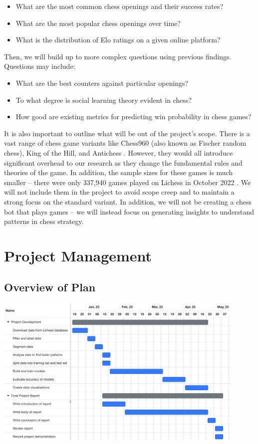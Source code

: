 \documentclass[%
 superscriptaddress,
showpacs,preprintnumbers,
 amsmath,
 amssymb,
 aps,
 pra,
showkeys,
onecolumn,
notitlepage,
11pt,
tightenlines      %
]{revtex4-1}
\begin{document}
\begin{itemize}
    \setlength\itemsep{0em}
    \item What are the most common chess openings and their success rates?
    \item What are the most popular chess openings over time?
    \item What is the distribution of Elo ratings on a given online platform?
\end{itemize}

Then, we will build up to more complex questions using previous findings. Questions may include:
\begin{itemize}
    \setlength\itemsep{0em}
    \item What are the best counters against particular openings?
    \item To what degree is social learning theory evident in chess?
    \item How good are existing metrics for predicting win probability in chess games?
\end{itemize}

It is also important to outline what will be out of the project's scope. There is a vast range of chess game variants like Chess960 (also known as Fischer random chess), King of the Hill, and Antichess \cite{lichessBlitzRatingDistribution}. However, they would all introduce significant overhead to our research as they change the fundamental rules and theories of the game. In addition, the sample sizes for these games is much smaller -- there were only 337,940 games played on Lichess in October 2022 \cite{lichessOpenDatabase}. We will not include them in the project to avoid scope creep and to maintain a strong focus on the standard variant. In addition, we will not be creating a chess bot that plays games -- we will instead focus on generating insights to understand patterns in chess strategy.

\section{Project Management}

\subsection{Overview of Plan}
\begin{center}
    \includegraphics[width=0.9\textwidth]{images/Gantt Chart - Project Management.png}
\end{center}
\end{document}
